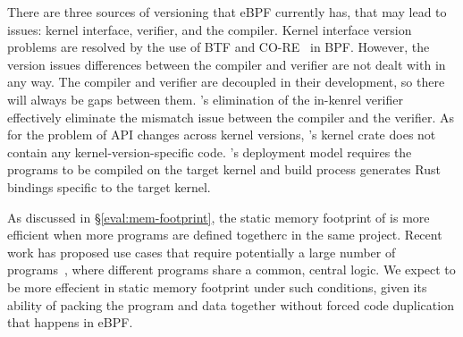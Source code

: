 There are three sources of versioning that eBPF currently has, that may lead to issues: kernel interface, verifier, and the compiler.
Kernel interface version problems are resolved by the use of BTF and CO-RE~\cite{bpf-core} in BPF.
However, the version issues differences between the compiler and verifier are not dealt
    with in any way.
The compiler and verifier are decoupled in their development, so there will
    always be gaps between them.
\projname{}'s elimination of the in-kenrel verifier effectively eliminate the
    mismatch issue between the compiler and the verifier.
As for the problem of API changes across kernel versions, \projname{}'s kernel
    crate does not contain any kernel-version-specific code.
\projname{}'s deployment model requires the programs to be compiled on the
    target kernel and build process generates Rust bindings specific to the
    target kernel.


As discussed in \S\ref{eval:mem-footprint}, the static memory footprint of
    \projname{} is more efficient when more programs are defined togetherc in
    the same project.
Recent work has proposed use cases that require potentially a large number of
    programs~\cite{ebpf-kcfi}, where different programs share a common, central
    logic.
We expect \projname{} to be more effecient in static memory footprint under
    such conditions, given its ability of packing the program and data together
    without forced code duplication that happens in eBPF.



